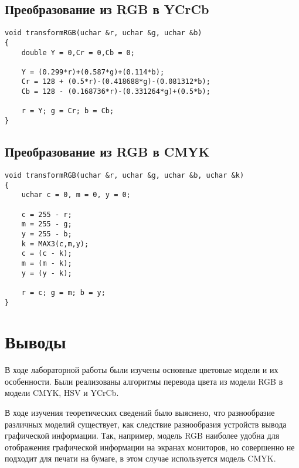 \newpage
\subsection{Преобразование из RGB в YCrCb}
\begin{lstlisting}
void transformRGB(uchar &r, uchar &g, uchar &b)
{
    double Y = 0,Cr = 0,Cb = 0;

    Y = (0.299*r)+(0.587*g)+(0.114*b);
    Cr = 128 + (0.5*r)-(0.418688*g)-(0.081312*b);
    Cb = 128 - (0.168736*r)-(0.331264*g)+(0.5*b);

    r = Y; g = Cr; b = Cb;
}
\end{lstlisting}

\subsection{Преобразование из RGB в CMYK}
\begin{lstlisting}
void transformRGB(uchar &r, uchar &g, uchar &b, uchar &k)
{
    uchar c = 0, m = 0, y = 0;

    c = 255 - r;
    m = 255 - g;
    y = 255 - b;
    k = MAX3(c,m,y);
    c = (c - k);
    m = (m - k);
    y = (y - k);

    r = c; g = m; b = y;
}
\end{lstlisting}

\section{Выводы}
В ходе лабораторной работы были изучены основные цветовые модели и их особенности. Были реализованы алгоритмы перевода цвета из модели RGB в модели CMYK, HSV и YCrCb.

В ходе изучения теоретических сведений было выяснено, что разнообразие различных моделий существует, как следствие разнообразия устройств вывода графической информации. Так, например, модель RGB наиболее удобна для отображения графической информации на экранах мониторов, но совершенно не подходит для печати на бумаге, в этом случае используется модель CMYK.